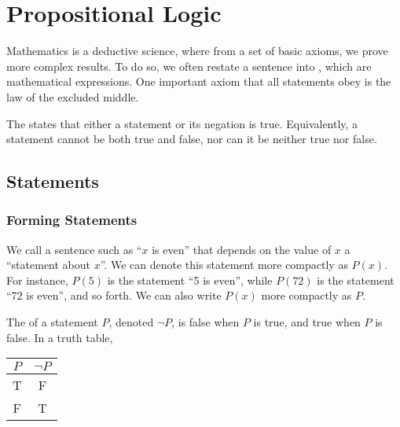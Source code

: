 \chapter{Propositional Logic}

Mathematics is a deductive science, where from a set of basic axioms, we prove more complex results. To do so, we often restate a sentence into , which are mathematical expressions. One important axiom that all statements obey is the law of the excluded middle.

\begin{axiom}
    The  states that either a statement or its negation is true. Equivalently, a statement cannot be both true and false, nor can it be neither true nor false.
\end{axiom}

\section{Statements}

\subsection{Forming Statements}

We call a sentence such as ``$x$ is even'' that depends on the value of $x$ a ``statement about $x$''. We can denote this statement more compactly as $P(x)$. For instance, $P(5)$ is the statement ``5 is even'', while $P(72)$ is the statement ``72 is even'', and so forth. We can also write $P(x)$ more compactly as $P$.

\begin{definition}
    The  of a statement $P$, denoted $\lnot P$, is false when $P$ is true, and true when $P$ is false. In a truth table,
    \begin{table}[H]
        \centering
        \begin{tabular}{|c|c|}
        \hline
        $P$ & $\lnot P$ \\ \hline\hline
        T & F \\ \hline
        F & T \\ \hline
        \end{tabular}
    \end{table}
\end{definition}

